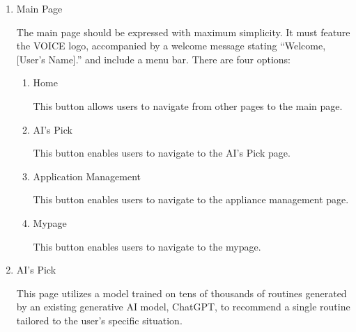 \documentclass[conference]{IEEEtran}
\begin{document}
\begin{enumerate}[label=\arabic*]
    \item Main Page\par
    \vspace{0.3em}
    The main page should be expressed with maximum simplicity. It must feature the VOICE logo, accompanied by a welcome message stating “Welcome, [User's Name].” and include a menu bar. There are four options:
    \vspace{0.3em}

    \begin{enumerate}[label=\arabic*)]
        \item Home\par
        \vspace{0.3em}
        This button allows users to navigate from other pages to the main page.

        \vspace{0.5em}

        \item AI's Pick\par
        \vspace{0.3em}
        This button enables users to navigate to the AI’s Pick page.

        \vspace{0.5em}

        \item Application Management\par
        \vspace{0.3em}
        This button enables users to navigate to the appliance management page.

        \vspace{0.5em}

        \item Mypage\par
        \vspace{0.3em}
        This button enables users to navigate to the mypage.
    \end{enumerate}
    
    \vspace{1em}

    \item AI's Pick\par
    \vspace{0.3em}
    This page utilizes a model trained on tens of thousands of routines generated by an existing generative AI model, ChatGPT, to recommend a single routine tailored to the user's specific situation.
    \vspace{0.3em}


\end{enumerate}
\end{document}
